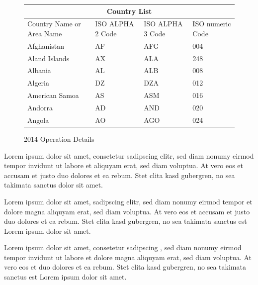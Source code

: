 \documentclass[12pt]{report}
\begin{document}
\begin{figure}[htpb]
\centering
\begin{tabular}{ |p{3cm}||p{3cm}|p{3cm}|p{3cm}|  }
 \hline
 \multicolumn{4}{|c|}{Country List} \\
 \hline
 Country Name or Area Name& ISO ALPHA 2 Code &ISO ALPHA 3 Code&ISO numeric Code\\
 \hline
 Afghanistan   & AF    &AFG&   004\\
 Aland Islands&   AX  & ALA   &248\\
 Albania &AL & ALB&  008\\
 Algeria    &DZ & DZA&  012\\
 American Samoa&   AS  & ASM&016\\
 Andorra& AD  & AND   &020\\
 Angola& AO  & AGO&024\\
 \hline
\end{tabular}
\caption{2014 Operation Details}
\label{fig:stat-table}
\end{figure}


Lorem ipsum dolor sit amet, consetetur sadipscing elitr, sed diam nonumy eirmod tempor invidunt ut labore et  aliquyam erat, sed diam voluptua. At vero eos et accusam et justo duo dolores et ea rebum. Stet clita kasd gubergren, no sea takimata sanctus  dolor sit amet.

Lorem ipsum dolor sit amet,  sadipscing elitr, sed diam nonumy eirmod tempor  et dolore magna aliquyam erat, sed diam voluptua. At vero eos et accusam et justo duo dolores et ea rebum. Stet clita kasd gubergren, no sea takimata sanctus est Lorem ipsum dolor sit amet.

\newpage

Lorem ipsum dolor sit amet, consetetur sadipscing , sed diam nonumy eirmod tempor invidunt ut labore et dolore magna aliquyam erat, sed diam voluptua. At vero eos et  duo dolores et ea rebum. Stet clita kasd gubergren, no sea takimata sanctus est Lorem ipsum dolor sit amet.
\end{document}
